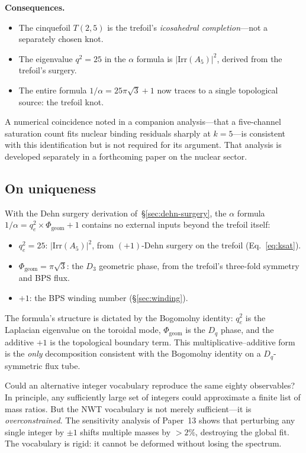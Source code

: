 \documentclass[11pt]{article}
\begin{document}
\medskip
\noindent\textbf{Consequences.}\\
\begin{itemize}\setlength\itemsep{0pt}
  \item The cinquefoil $T(2,5)$ is the trefoil's
    \emph{icosahedral completion}---not a separately chosen knot.
  \item The eigenvalue $q^2 = 25$ in the $\alpha$ formula is
    $|\mathrm{Irr}(A_5)|^2$, derived from the trefoil's surgery.
  \item The entire formula $1/\alpha = 25\pi\sqrt{3} + 1$ now
    traces to a single topological source: the trefoil knot.
\end{itemize}

A numerical coincidence noted in a companion analysis---that a
five-channel saturation count fits nuclear binding residuals
sharply at $k = 5$---is consistent with this identification but
is not required for its argument.  That analysis is developed
separately in a forthcoming paper on the nuclear sector.

\subsection{On uniqueness}
\label{sec:uniqueness}

With the Dehn surgery derivation of~\S\ref{sec:dehn-surgery}, the
$\alpha$ formula
$1/\alpha = q_e^2 \times \Phi_\text{geom} + 1$
contains no external inputs beyond the trefoil itself:
\begin{itemize}\setlength\itemsep{0pt}
  \item $q_e^2 = 25$: $|\mathrm{Irr}(A_5)|^2$, from $(+1)$-Dehn
    surgery on the trefoil (Eq.~\ref{eq:ksat}).
  \item $\Phi_\text{geom} = \pi\sqrt{3}$: the $D_3$ geometric
    phase, from the trefoil's three-fold symmetry and BPS flux.
  \item $+1$: the BPS winding number
    (\S\ref{sec:winding}).
\end{itemize}
The formula's structure is dictated by the Bogomolny identity:
$q_e^2$ is the Laplacian eigenvalue on the toroidal mode,
$\Phi_\text{geom}$ is the $D_q$ phase, and the additive $+1$ is
the topological boundary term.  This multiplicative--additive
form is the \emph{only} decomposition consistent with the
Bogomolny identity on a $D_q$-symmetric flux tube.

Could an alternative integer vocabulary reproduce the same eighty
observables?  In principle, any sufficiently large set of integers
could approximate a finite list of mass ratios.  But the NWT
vocabulary is not merely sufficient---it is \emph{overconstrained}.
The sensitivity analysis of Paper~13 shows that perturbing any
single integer by $\pm 1$ shifts multiple masses by $>2\%$,
destroying the global fit.  The vocabulary is rigid: it cannot be
deformed without losing the spectrum.
\end{document}
